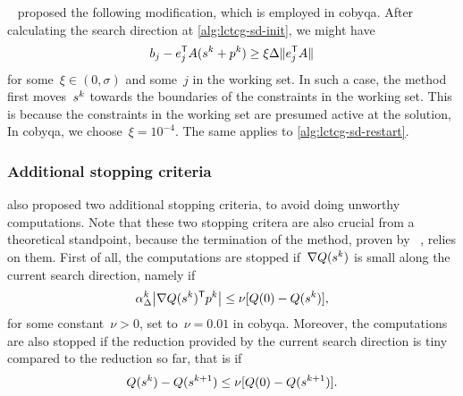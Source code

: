 
~\cite{Powell_2015} proposed the following modification, which is employed in \gls{cobyqa}.
After calculating the search direction at \cref{alg:lctcg-sd-init}, we might have
\begin{equation*}
    b_j - e_j^{\T} A(\sstep[k] + \pstep[k]) \ge \xi \rad \norm{e_j^{\T} A}
\end{equation*}
for some~$\xi \in (0, \sigma)$ and some~$j$ in the working set.
In such a case, the method first moves~$\sstep[k]$ towards the boundaries of the constraints in the working set.
This is because the constraints in the working set are presumed active at the solution,
In \gls{cobyqa}, we choose~$\xi = 10^{-4}$.
The same applies to \cref{alg:lctcg-sd-restart}.

\subsubsection{Additional stopping criteria}

 also proposed two additional stopping criteria, to avoid doing unworthy computations.
Note that these two stopping critera are also crucial from a theoretical standpoint, because the termination of the method, proven by \citeauthor{Powell_2015}~\cite[\S~5]{Powell_2015}, relies on them.
First of all, the computations are stopped if~$\nabla Q(\sstep[k])$ is small along the current search direction, namely if
\begin{equation*}
    \alpha_{\rad}^k \abs[\big]{\nabla Q(\sstep[k])^{\T} \pstep[k]} \le \nu [Q(0) - Q(\sstep[k])],
\end{equation*}
for some constant~$\nu > 0$, set to~$\nu = 0.01$ in \gls{cobyqa}.
Moreover, the computations are also stopped if the reduction provided by the current search direction is tiny compared to the reduction so far, that is if
\begin{equation*}
    Q(\sstep[k]) - Q(\sstep[k + 1]) \le \nu [Q(0) - Q(\sstep[k + 1])].
\end{equation*}


